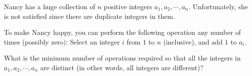 Nancy has a huge collection of $n$ positive integers $a_1,a_2,\cdots,a_n$. Unfortunately, she is not satisfied since there are duplicate integers in them.

To make Nancy happy, you can perform the following operation any number of times (possibly zero): Select an integer $i$ from $1$ to $n$ (inclusive), and add $1$ to $a_i$. 

What is the minimum number of operations required so that all the integers in $a_1,a_2,\cdots,a_n$ are distinct (in other words, all integers are different)?